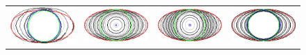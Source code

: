 \begin{figure}
\begin{tabular}{cccc}
\includegraphics[scale=0.18]{figures/chapter9/free-elastica/localsearch/ellipse/len_pen-0.01/radius-7/summary.pdf} & 
\includegraphics[scale=0.18]{figures/chapter9/free-elastica/flipflow/ellipse/len_pen-0.01/radius-7/summary.pdf} &
\includegraphics[scale=0.18]{figures/chapter9/free-elastica/balanceflow/ellipse/len_pen-0.01/radius-7/summary.pdf} &
\includegraphics[scale=0.18]{figures/chapter9/free-elastica/graphflow/ellipse/len_pen-0.01/radius-7/summary.pdf} \\[1em]

\end{tabular}
\end{figure}
